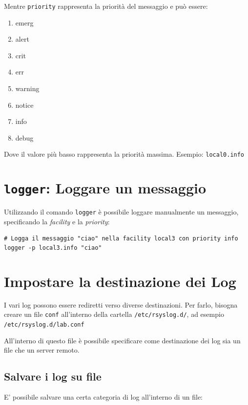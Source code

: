 \documentclass[a4paper]{report}
\newenvironment{code}{\begin{tcolorbox}[size=small]}{\end{tcolorbox}}
\begin{document}
Mentre \texttt{priority} rappresenta la priorità del messaggio e può essere:

\begin{multicols}{4}
	\begin{enumerate}
		\item emerg
		\item alert
		\item crit
		\item err
		\item warning
		\item notice
		\item info
		\item debug
	\end{enumerate}
\end{multicols}

Dove il valore più basso rappresenta la priorità massima. Esempio: \texttt{local0.info}

\section{\texttt{logger}: Loggare un messaggio}
Utilizzando il comando \texttt{logger} è possibile loggare manualmente un messaggio, specificando la \textit{facility} e la \textit{priority}:

\begin{code}
\begin{lstlisting}
# Logga il messaggio "ciao" nella facility local3 con priority info
logger -p local3.info "ciao"
\end{lstlisting}
\end{code}

\section{Impostare la destinazione dei Log}

I vari log possono essere rediretti verso diverse destinazioni. Per farlo, bisogna creare un file \texttt{conf} all'interno della cartella \texttt{/etc/rsyslog.d/}, ad esempio \texttt{/etc/rsyslog.d/lab.conf}

All'interno di questo file è possibile specificare come destinazione dei log sia un file che un server remoto.

\subsection{Salvare i log su file}

E' possibile salvare una certa categoria di log all'interno di un file:
\end{document}

